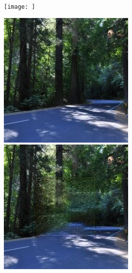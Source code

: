 \documentclass[a4paper, 11pt]{article}
\begin{document}
\begin{figure}
\begin{minipage}{.3\textwidth}
    \end{minipage}
    \begin{minipage}{.3\textwidth}
      \centering
      \texttt{[image: ]}
    \end{minipage}
\end{figure}

\begin{figure}
    \centering
    \begin{minipage}{.3\textwidth}
      \centering
      \includegraphics[width=.95\linewidth]{documentation/img/forest_path.jpg}
    \end{minipage}%
    \begin{minipage}{.3\textwidth}
      \centering
      \includegraphics[width=.95\linewidth]{documentation/img/forest_path_out_45k.png}

\end{minipage}
\end{figure}
\end{document}
